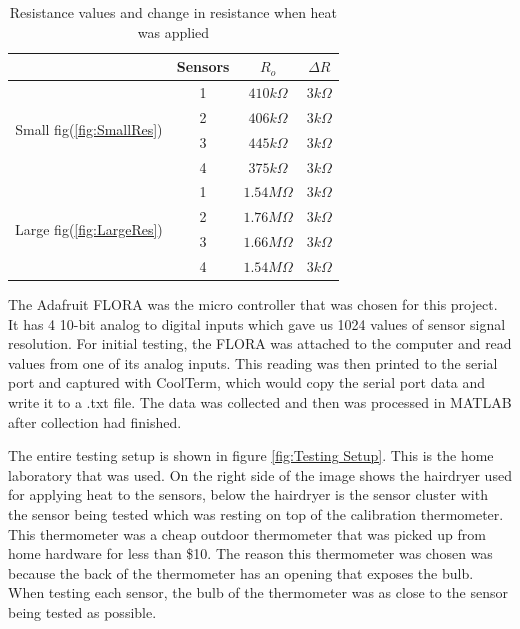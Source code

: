 \documentclass[12pt,a4paper]{report}
\begin{document}
\begin{table}[h!]
    \centering
    \caption{Resistance values and change in resistance when heat was applied}
    \label{tab:BaseResistTable}
    \begin{tabular}{|c|c|c|c|}
        \hline
        & Sensors & $R_o$ & $\Delta R$  \\
        \hline
        \multirow{4}{*}{Small fig(\ref{fig:SmallRes})} & 1 & $410k\Omega$ & $3k\Omega$ \\
        & 2 & $406k\Omega$ & $3k\Omega$  \\
        & 3 & $445k\Omega$ & $3k\Omega$  \\
        & 4 & $375k\Omega$ & $3k\Omega$  \\
        \hline
        \multirow{4}{*}{Large fig(\ref{fig:LargeRes})}& 1 & $1.54M\Omega$ & $3k\Omega$  \\
        & 2 & $1.76M\Omega$ & $3k\Omega$  \\
        & 3 & $1.66M\Omega$ & $3k\Omega$ \\
        & 4 & $1.54M\Omega$ & $3k\Omega$  \\
        \hline
    \end{tabular}
\end{table}

The Adafruit FLORA was the micro controller that was chosen for this project. It has 4 10-bit analog to digital inputs which gave us 1024 values of sensor signal resolution. For initial testing, the FLORA was attached to the computer and read values from one of its analog inputs. This reading was then printed to the serial port and captured with CoolTerm, which would copy the serial port data and write it to a .txt file. The data was collected and then was processed in MATLAB after collection had finished. 
\par
The entire testing setup is shown in figure \ref{fig:Testing Setup}. This is the home laboratory that was used. On the right side of the image shows the hairdryer used for applying heat to the sensors, below the hairdryer is the sensor cluster with the sensor being tested which was resting on top of the calibration thermometer. This thermometer was a cheap outdoor thermometer that was picked up from home hardware for less than \$10. The reason this thermometer was chosen was because the back of the thermometer has an opening that exposes the bulb. When testing each sensor, the bulb of the thermometer was as close to the sensor being tested as possible. 
\end{document}
